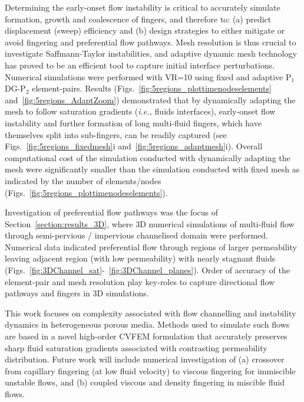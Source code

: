 \documentclass[preprint,authoryear,12pt]{elsarticle}
\newcommand{\PN}[2][error]{P$_{#1}$DG-P$_{#2}$}
\newcommand{\ie}{{\it i.e., }}
\begin{document}
\medskip
Determining the early-onset flow instability is critical to accurately simulate formation, growth and coalescence of fingers, and therefore to: (a) predict displacement (sweep) efficiency and (b) design strategies to either mitigate or avoid fingering and preferential flow pathways. Mesh resolution is thus crucial to investigate Saffmann-Taylor instabilities, and adaptive dynamic mesh technology has proved to be an efficient tool to capture initial interface perturbations. Numerical simulations were performed with VR=10 using fixed and adaptive \PN[1]{2} element-pairs. Results (Figs.~\ref{fig:5regions_plottimenodeselements} and~\ref{fig:5regions_AdaptZoom}) demonstrated that by dynamically adapting the mesh to follow saturation gradients (\ie fluids interfaces), early-onset flow instability and further formation of long multi-fluid fingers, which have themselves split into sub-fingers, can be readily captured (see Figs.~\ref{fig:5regions_fixedmesh}i and~\ref{fig:5regions_adaptmesh}i). Overall computational cost of the simulation conducted with dynamically adapting the mesh were significantly smaller than the simulation conducted with fixed mesh as indicated by the number of elements/nodes (Figs.~\ref{fig:5regions_plottimenodeselements}).

\medskip
Investigation of preferential flow pathways was the focus of Section~\ref{section:results_3D}, where 3D numerical simulations of multi-fluid flow through semi-pervious / impervious channelised domain were performed. Numerical data indicated preferential flow through regions of larger permeability leaving adjacent region (with low permeability) with nearly stagnant fluids (Figs.~\ref{fig:3DChannel_sat}-~\ref{fig:3DChannel_planes}). Order of accuracy of the element-pair and mesh resolution play key-roles to capture directional flow pathways and fingers in 3D simulations.

\medskip
This work focuses on complexity associated with flow channelling and instability dynamics in heterogeneous porous media. Methods used to simulate such flows are based in a novel high-order CVFEM formulation that accurately preserves sharp fluid saturation gradients associated with contrasting permeability distribution. Future work will include numerical investigation of (a) crossover from capillary fingering (at low fluid velocity) to viscous fingering for immiscible unstable flows, and (b) coupled viscous and density fingering in miscible fluid flows.
\end{document}
